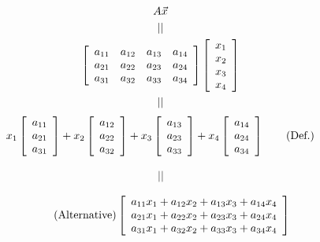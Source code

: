 \documentclass[pdf,9pt]{beamer}
\begin{document}
\begin{frame}[fragile]
\begin{gather*}
A\vec{x}
\\ || \\
\left[ \begin{array}{cccc}
  a_{11} & a_{12} & a_{13} & a_{14} \\
  a_{21} & a_{22} & a_{23} & a_{24} \\
  a_{31} & a_{32} & a_{33} & a_{34}
\end{array} \right] \left[ \begin{array}{c}
  x_{1} \\
  x_{2} \\
  x_{3} \\
  x_{4}
\end{array} \right]
\\ || \\
\end{gather*}
\vspace{-3em}
\begin{align}
x_{1} \left[ \begin{array}{c}
  a_{11} \\
  a_{21} \\
  a_{31}
\end{array} \right] + x_{2} \left[ \begin{array}{c}
  a_{12} \\
  a_{22} \\
  a_{32}
\end{array} \right] + x_{3} \left[ \begin{array}{c}
  a_{13} \\
  a_{23} \\
  a_{33}
\end{array} \right] + x_{4} \left[ \begin{array}{c}
  a_{14} \\
  a_{24} \\
  a_{34}
\end{array} \right]
\tag{Def.}
\end{align}
\vspace{-3em}
\begin{align*}
\\ || \\
\end{align*}
\vspace{-3em}
\begin{align}
    \tag{Alternative}
    \left[ \begin{array}{c}
  a_{11}x_{1} + a_{12}x_{2} + a_{13}x_{3} + a_{14}x_{4} \\
  a_{21}x_{1} + a_{22}x_{2} + a_{23}x_{3} + a_{24}x_{4} \\
  a_{31}x_{1} + a_{32}x_{2} + a_{33}x_{3} + a_{34}x_{4}
\end{array} \right]
\end{align}
\end{frame}
\end{document}
